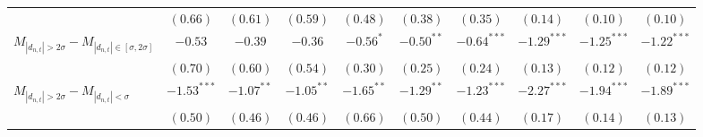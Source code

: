 \begin{tabular}{lccccccccc}
   & $(0.66)$ & $(0.61)$ & $(0.59)$ & $(0.48)$ & $(0.38)$ & $(0.35)$ & $(0.14)$ & $(0.10)$ & $(0.10)$ \\ 
  $M_{|d_{n,t}| > 2 \sigma} - M_{|d_{n,t}| \in [\sigma, 2\sigma]}$ & $-0.53$ & $-0.39$ & $-0.36$ & $-0.56^{*}$ & $-0.50^{**}$ & $-0.64^{***}$ & $-1.29^{***}$ & $-1.25^{***}$ & $-1.22^{***}$ \\ 
   & $(0.70)$ & $(0.60)$ & $(0.54)$ & $(0.30)$ & $(0.25)$ & $(0.24)$ & $(0.13)$ & $(0.12)$ & $(0.12)$ \\ 
  $M_{|d_{n,t}| > 2 \sigma} - M_{|d_{n,t}| < \sigma}$ & $-1.53^{***}$ & $-1.07^{**}$ & $-1.05^{**}$ & $-1.65^{**}$ & $-1.29^{**}$ & $-1.23^{***}$ & $-2.27^{***}$ & $-1.94^{***}$ & $-1.89^{***}$ \\ 
   & $(0.50)$ & $(0.46)$ & $(0.46)$ & $(0.66)$ & $(0.50)$ & $(0.44)$ & $(0.17)$ & $(0.14)$ & $(0.13)$ \\ 
   \hline 
\end{tabular}
